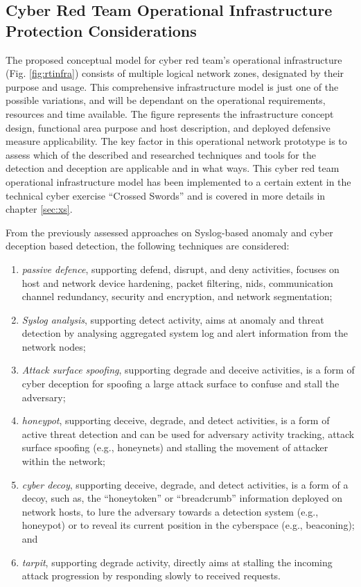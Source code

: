\subsection{Cyber Red Team Operational Infrastructure Protection Considerations}
\label{sec:opinfra}
The proposed conceptual model for cyber red team's operational infrastructure (Fig. \ref{fig:rtinfra}) consists of multiple logical network zones, designated by their purpose and usage. This comprehensive infrastructure model is just one of the possible variations, and will be dependant on the operational requirements, resources and time available. The figure represents the infrastructure concept design, functional area purpose and host description, and deployed defensive measure applicability. The key factor in this operational network prototype is to assess which of the described and researched techniques and tools for the detection and deception are applicable and in what ways.
This cyber red team operational infrastructure model has been implemented to a certain extent in the technical cyber exercise ``Crossed Swords'' and is covered in more details in chapter \ref{sec:xs}.

From the previously assessed approaches on Syslog-based anomaly and cyber deception based detection, the following techniques are considered: 
\begin{enumerate}
    \item \textit{passive defence}, supporting defend, disrupt, and deny activities, focuses on host and network device hardening, packet filtering, \gls{nids}, communication channel redundancy, security and encryption, and network segmentation;
    \item \textit{Syslog analysis}, supporting detect activity, aims at anomaly and threat detection by analysing aggregated system log and alert information from the network nodes;
    \item \textit{Attack surface spoofing}, supporting degrade and deceive activities, is a form of cyber deception for spoofing a large attack surface to confuse and stall the adversary;
    \item \textit{honeypot}, supporting deceive, degrade, and detect activities, is a form of active threat detection and can be used for adversary activity tracking, attack surface spoofing (e.g., honeynets) and stalling the movement of attacker within the network;
    \item \textit{cyber decoy}, supporting deceive, degrade, and detect activities, is a form of a decoy, such as, the ``honeytoken'' or ``breadcrumb'' information deployed on network hosts, to lure the adversary towards a detection system (e.g., honeypot) or to reveal its current position in the cyberspace (e.g., beaconing); and
    \item \textit{tarpit}, supporting degrade activity, directly aims at stalling the incoming attack progression by responding slowly to received requests.
\end{enumerate}

